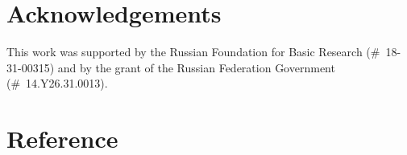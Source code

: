 \documentclass[authoryear]{elsarticle}
\begin{document}
\pagebreak
\newpage
\section*{Acknowledgements}

This work was supported by the Russian Foundation for Basic Research (\#~18-31-00315) 
and by the grant of the Russian Federation Government (\#~14.Y26.31.0013).

\section*{Reference}

\end{document}
